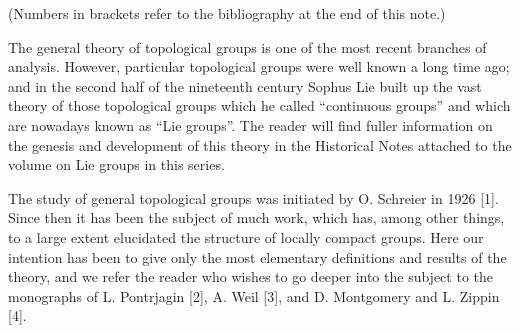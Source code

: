
(Numbers in brackets refer to the bibliography at the end of this note.)

The general theory of topological groups is one of the most recent branches of analysis. However, particular topological groups were well known a long time ago; and in the second half of the nineteenth century Sophus Lie built up the vast theory of those topological groups which he called ``continuous groups'' and which are nowadays known as ``Lie groups''. The reader will find fuller information on the genesis and development of this theory in the Historical Notes attached to the volume on Lie groups in this series.

The study of general topological groups was initiated by O. Schreier in 1926 {[}1{]}. Since then it has been the subject of much work, which has, among other things, to a large extent elucidated the structure of locally compact groups. Here our intention has been to give only the most elementary definitions and results of the theory, and we refer the reader who wishes to go deeper into the subject to the monographs of L. Pontrjagin {[}2{]}, A. Weil {[}3{]}, and D. Montgomery and L. Zippin {[}4{]}.

